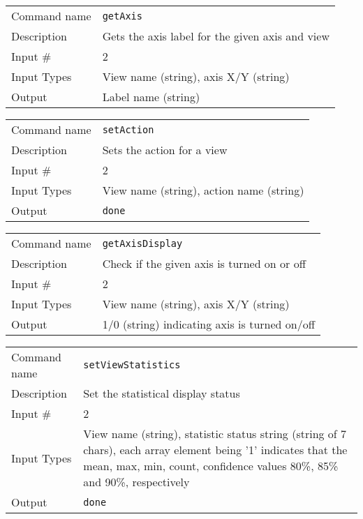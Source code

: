 \bigskip

\noindent
\begin{tabular}{l|p{5in}}
\hline
Command name & {\tt getAxis} \\
Description  & Gets the axis label for the given axis and view \\
Input \#     & 2 \\
Input Types  & View name (string), axis X/Y (string) \\
Output       & Label name (string) \\
\hline
\end{tabular}

\bigskip

\noindent
\begin{tabular}{l|p{5in}}
\hline
Command name & {\tt setAction} \\
Description  & Sets the action for a view \\
Input \#     & 2 \\
Input Types  & View name (string), action name (string) \\
Output       & {\tt done} \\
\hline
\end{tabular}

\bigskip

\noindent
\begin{tabular}{l|p{5in}}
\hline
Command name & {\tt getAxisDisplay} \\
Description  & Check if the given axis is turned on or off \\
Input \#     & 2 \\
Input Types  & View name (string), axis  X/Y (string) \\
Output       & 1/0 (string) indicating axis is turned on/off \\
\hline
\end{tabular}

\bigskip

\noindent
\begin{tabular}{l|p{5in}}
\hline
Command name & {\tt setViewStatistics} \\
Description  & Set the statistical display status \\
Input \#     & 2 \\
Input Types  & View name (string), statistic status string (string
               of 7 chars), each array element being '1' indicates
               that the mean, max, min, count, confidence values 80\%,
               85\% and 90\%, respectively \\
Output       & {\tt done} \\
\hline
\end{tabular}

